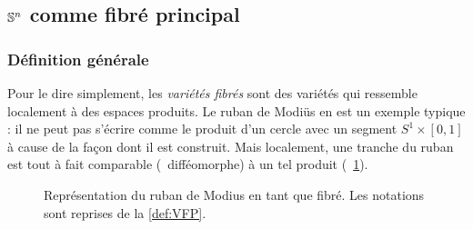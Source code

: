 \subsection{$\S{n}$ comme fibré principal} \label{subsec:VFP}

\subsubsection{Définition générale}\label{subsec:def2VFP}

Pour le dire simplement, les \emph{variétés fibrés} sont des variétés qui ressemble localement à des espaces produits. 
Le ruban de Modiüs en est un exemple typique : il ne peut pas s'écrire comme le produit d'un cercle avec un segment $S^{1}\times [0,1]$ à cause de la façon dont il est construit. Mais localement, une tranche du ruban est tout à fait comparable (\ie~difféomorphe) à un tel produit (\cf~\cref{fig:ruban2modius}).
\begin{figure}[h]
	
	\caption[Ruban de Mobius comme variété fibrée]{Représentation du ruban de Modius en tant que fibré. Les notations sont reprises de la \cref{def:VFP}.}
	\label{fig:ruban2modius}
\end{figure}
\skipl

